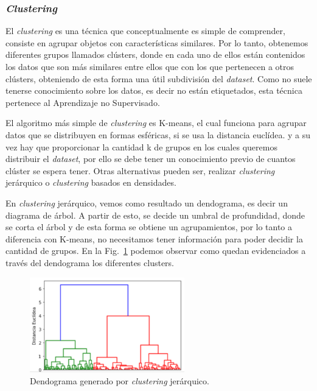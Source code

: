 \documentclass[a4paper,12pt]{article}
\begin{document}
\clearpage

\subsubsection{\textit{Clustering}}

El \textit{clustering} es una técnica que conceptualmente es simple de comprender, consiste en agrupar objetos con características similares. Por lo tanto, obtenemos diferentes grupos llamados clústers, donde en cada uno de ellos están contenidos los datos que son más similares entre ellos que con los que pertenecen a otros clústers, obteniendo de esta forma una útil subdivisión del \textit{dataset}. Como no suele tenerse conocimiento sobre los datos, es decir no están etiquetados, esta técnica pertenece al Aprendizaje no Supervisado.

El algoritmo más simple de \textit{clustering} es K-means, el cual funciona para agrupar datos que se distribuyen en formas esféricas, si se usa la distancia euclídea. y a su vez hay que proporcionar la cantidad k de grupos en los cuales queremos distribuir el \textit{dataset}, por ello se debe tener un conocimiento previo de cuantos clúster se espera tener. 
Otras alternativas pueden ser, realizar \textit{clustering} jerárquico o \textit{clustering} basados en densidades.

En \textit{clustering} jerárquico, vemos como resultado un dendograma, es decir un diagrama de árbol. A partir de esto, se decide un umbral de profundidad, donde se corta el árbol y  de esta forma se obtiene un agrupamientos, por lo tanto a diferencia con K-means, no necesitamos tener información para poder decidir la cantidad de grupos. En la Fig.~\ref{fig:dendogram.} podemos observar como quedan evidenciados a través del dendograma los diferentes clusters.

\begin{figure}[H]
	\begin{center}				
	\includegraphics[width=0.6\textwidth]{tesis_16.png}
  	\caption{Dendograma generado por \textit{clustering} jerárquico.}
  	\label{fig:dendogram.}
  	\end{center}
\end{figure}
\end{document}
